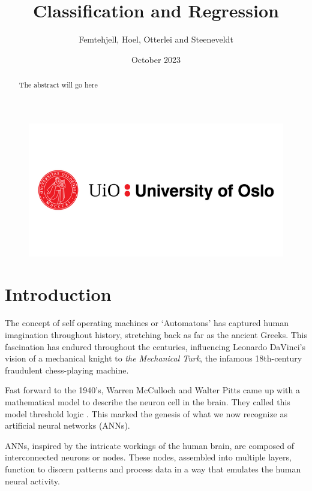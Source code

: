 \documentclass{article}
\title{Classification and Regression}
\author{Femtehjell, Hoel, Otterlei and Steeneveldt}
\date{October 2023}
\theoremstyle{definition}
\begin{document}

\maketitle
\begin{figure}[H]
    \centering
    \includegraphics[scale=0.5]{1797261_uio-logo.png}
\end{figure}
\newpage
\tableofcontents
\listoffigures


\newpage

\begin{abstract}
    The abstract will go here
\end{abstract}

\section{Introduction}
The concept of self operating machines or `Automatons' has captured human imagination throughout history, stretching back as far as the ancient Greeks. This fascination has endured throughout the centuries, influencing Leonardo DaVinci's vision of a mechanical knight to \textit{the Mechanical Turk}, the infamous 18th-century fraudulent chess-playing machine.

Fast forward to the 1940's, Warren McCulloch and Walter Pitts came up with a mathematical model to describe the neuron cell in the brain. They called this model threshold logic \parencite{mcculloch1943logical}. This marked the genesis of what we now recognize as artificial neural networks (ANNs).

ANNs, inspired by the intricate workings of the human brain, are composed of interconnected neurons or nodes. These nodes, assembled into multiple layers, function to discern patterns and process data in a way that emulates the human neural activity.
\end{document}
